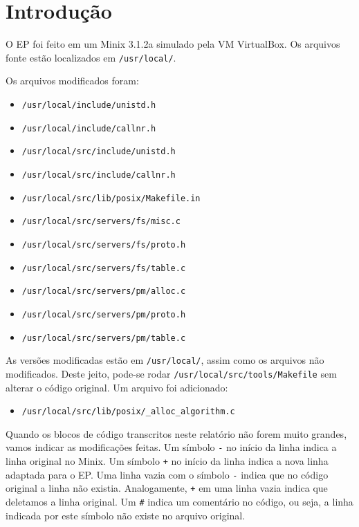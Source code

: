 \documentclass{amsart}
\title[]{\rule{10.5cm}{0.8pt}\\Exercício-Programa 3:\\
Políticas de Alocação
\\\vspace{2mm}\footnotesize
  Sistemas Operacionais --- MAC0422\\\rule{10cm}{0.8pt}}
\author[]{Renato Lui Geh\\NUSP\@: 8536030\\
          Guilherme Freire\\NUSP\@: 7557373}
\theoremstyle{plain}
\newcommand{\code}[1]{\lstinline[mathescape=true]{#1}}
\begin{document}
\date{\today}
\maketitle

\section{Introdução}

O EP foi feito em um Minix 3.1.2a simulado pela VM VirtualBox. Os arquivos fonte estão localizados
em \code{/usr/local/}.

Os arquivos modificados foram:

\begin{itemize}
  \item \code{/usr/local/include/unistd.h}
  \item \code{/usr/local/include/callnr.h}
  \item \code{/usr/local/src/include/unistd.h}
  \item \code{/usr/local/src/include/callnr.h}
  \item \code{/usr/local/src/lib/posix/Makefile.in}
  \item \code{/usr/local/src/servers/fs/misc.c}
  \item \code{/usr/local/src/servers/fs/proto.h}
  \item \code{/usr/local/src/servers/fs/table.c}
  \item \code{/usr/local/src/servers/pm/alloc.c}
  \item \code{/usr/local/src/servers/pm/proto.h}
  \item \code{/usr/local/src/servers/pm/table.c}
\end{itemize}

As versões modificadas estão em \code{/usr/local/}, assim como os arquivos não modificados. Deste
jeito, pode-se rodar \code{/usr/local/src/tools/Makefile} sem alterar o código original. Um arquivo foi adicionado:

\begin{itemize}
  \item \code{/usr/local/src/lib/posix/_alloc_algorithm.c}
\end{itemize}

Quando os blocos de código transcritos neste relatório não forem muito grandes, vamos indicar as
modificações feitas. Um símbolo \code{-} no início da linha indica a linha original no Minix. Um
símbolo \code{+} no início da linha indica a nova linha adaptada para o EP\@. Uma linha vazia com o
símbolo \code{-} indica que no código original a linha não existia. Analogamente, \code{+} em uma
linha vazia indica que deletamos a linha original. Um \code{#} indica um comentário no código, ou
seja, a linha indicada por este símbolo não existe no arquivo original.
\end{document}
